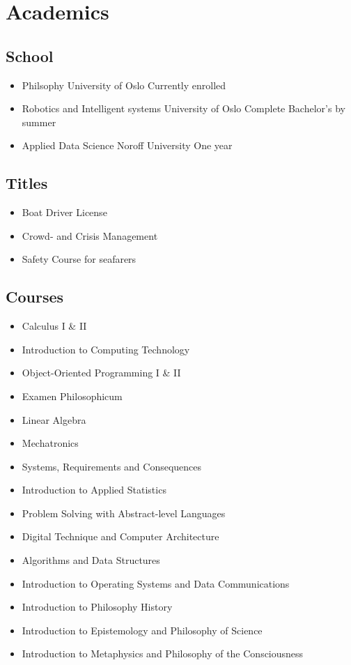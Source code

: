 \documentclass{curriculum}
\begin{document}
	\section{Academics}
	\begin{half}
	\subsection{School}
		\begin{itemize}
			\item Philsophy
				\subitem University of Oslo
				\subitem Currently enrolled
			\item Robotics and Intelligent systems
				\subitem University of Oslo
				\subitem Complete Bachelor's by summer
			\item Applied Data Science
				\subitem Noroff University
				\subitem One year
		\end{itemize}
	\subsection{Titles}
		\begin{itemize}
			\item Boat Driver License
			\item Crowd- and Crisis Management
			\item Safety Course for seafarers
		\end{itemize}
	\end{half}
	\begin{half}
	\subsection{Courses}
		\begin{itemize}
			\item Calculus I \& II
			\item Introduction to Computing Technology
			\item Object-Oriented Programming I \& II
			\item Examen Philosophicum
			\item Linear Algebra
			\item Mechatronics
			\item Systems, Requirements and Consequences
			\item Introduction to Applied Statistics
			\item Problem Solving with Abstract-level Languages
			\item Digital Technique and Computer Architecture
			\item Algorithms and Data Structures
			\item Introduction to Operating Systems and Data Communications
			\item Introduction to Philosophy History
			\item Introduction to Epistemology and Philosophy of Science
			\item Introduction to Metaphysics and Philosophy of the Consciousness
		\end{itemize}
	\end{half}
\end{document}
